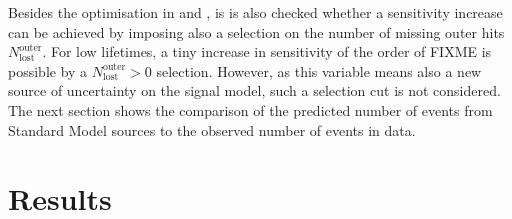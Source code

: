Besides the optimisation in \ias and \pt, is is also checked whether a sensitivity increase can be achieved by imposing also a selection on the number of missing outer hits $N_{\text{lost}}^{\text{outer}}$.
For low lifetimes, a tiny increase in sensitivity of the order of FIXME is possible by a $N_{\text{lost}}^{\text{outer}}>0$ selection.
However, as this variable means also a new source of uncertainty on the signal model, such a selection cut is not considered.\\

The next section shows the comparison of the predicted number of events from Standard Model sources to the observed number of events in data.

\chapter{Results}
\label{sec:Results}

